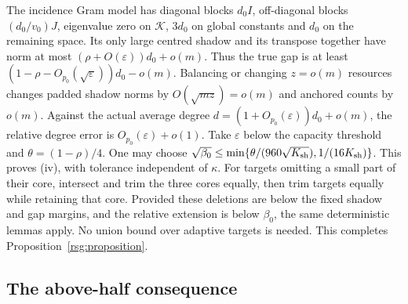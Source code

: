 The incidence Gram model has diagonal blocks $d_0I$, off-diagonal blocks $(d_0/v_0)J$, eigenvalue zero on $\mathcal{K}$, $3d_0$ on global constants and $d_0$ on the remaining space.  Its only large centred shadow and its transpose together have norm at most $(\rho+O(\varepsilon))d_0+o(m)$.  Thus the true gap is at least $(1-\rho-O_{p_0}(\sqrt\varepsilon))d_0-o(m)$. Balancing or changing $z=o(m)$ resources changes padded shadow norms by $O(\sqrt{mz})=o(m)$ and anchored counts by $o(m)$. Against the actual average degree $d=(1+O_{p_0}(\varepsilon))d_0+o(m)$, the relative degree error is $O_{p_0}(\varepsilon)+o(1)$. Take $\varepsilon$ below the capacity threshold and $\theta=(1-\rho)/4$.  One may choose $\sqrt{\beta_0}\le\min\{\theta/(960\sqrt{K_{\rm{}sh}}),1/(16K_{\rm{}sh})\}$. This proves (iv), with tolerance independent of $\kappa$. For targets omitting a small part of their core, intersect and trim
the three cores equally, then trim targets equally while retaining
that core.  Provided these deletions are below the fixed shadow and
gap margins, and the relative extension is below $\beta_0$, the same deterministic lemmas apply.  No union bound over adaptive
targets is needed.  This completes Proposition~\ref{rsg:proposition}.

\subsection{The above-half consequence}
\label{pf:section}

